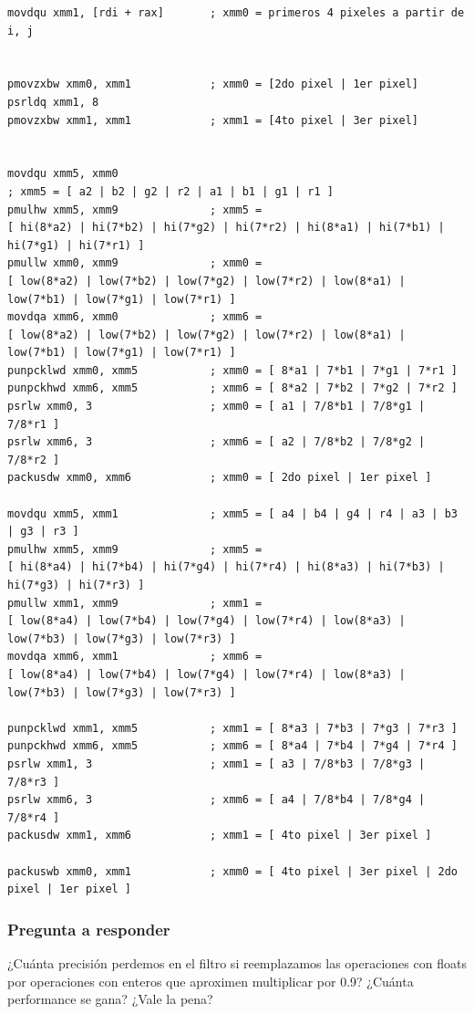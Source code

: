 \begin{codesnippet}
    \begin{verbatim}
movdqu xmm1, [rdi + rax]       ; xmm0 = primeros 4 pixeles a partir de i, j


pmovzxbw xmm0, xmm1            ; xmm0 = [2do pixel | 1er pixel]
psrldq xmm1, 8
pmovzxbw xmm1, xmm1            ; xmm1 = [4to pixel | 3er pixel]


movdqu xmm5, xmm0              
; xmm5 = [ a2 | b2 | g2 | r2 | a1 | b1 | g1 | r1 ]
pmulhw xmm5, xmm9              ; xmm5 = 
[ hi(8*a2) | hi(7*b2) | hi(7*g2) | hi(7*r2) | hi(8*a1) | hi(7*b1) | hi(7*g1) | hi(7*r1) ]
pmullw xmm0, xmm9              ; xmm0 = 
[ low(8*a2) | low(7*b2) | low(7*g2) | low(7*r2) | low(8*a1) | low(7*b1) | low(7*g1) | low(7*r1) ]
movdqa xmm6, xmm0              ; xmm6 = 
[ low(8*a2) | low(7*b2) | low(7*g2) | low(7*r2) | low(8*a1) | low(7*b1) | low(7*g1) | low(7*r1) ]
punpcklwd xmm0, xmm5           ; xmm0 = [ 8*a1 | 7*b1 | 7*g1 | 7*r1 ]
punpckhwd xmm6, xmm5           ; xmm6 = [ 8*a2 | 7*b2 | 7*g2 | 7*r2 ]
psrlw xmm0, 3                  ; xmm0 = [ a1 | 7/8*b1 | 7/8*g1 | 7/8*r1 ]
psrlw xmm6, 3                  ; xmm6 = [ a2 | 7/8*b2 | 7/8*g2 | 7/8*r2 ]
packusdw xmm0, xmm6            ; xmm0 = [ 2do pixel | 1er pixel ]

movdqu xmm5, xmm1              ; xmm5 = [ a4 | b4 | g4 | r4 | a3 | b3 | g3 | r3 ]
pmulhw xmm5, xmm9              ; xmm5 = 
[ hi(8*a4) | hi(7*b4) | hi(7*g4) | hi(7*r4) | hi(8*a3) | hi(7*b3) | hi(7*g3) | hi(7*r3) ]
pmullw xmm1, xmm9              ; xmm1 = 
[ low(8*a4) | low(7*b4) | low(7*g4) | low(7*r4) | low(8*a3) | low(7*b3) | low(7*g3) | low(7*r3) ]
movdqa xmm6, xmm1              ; xmm6 = 
[ low(8*a4) | low(7*b4) | low(7*g4) | low(7*r4) | low(8*a3) | low(7*b3) | low(7*g3) | low(7*r3) ]

punpcklwd xmm1, xmm5           ; xmm1 = [ 8*a3 | 7*b3 | 7*g3 | 7*r3 ]
punpckhwd xmm6, xmm5           ; xmm6 = [ 8*a4 | 7*b4 | 7*g4 | 7*r4 ]
psrlw xmm1, 3                  ; xmm1 = [ a3 | 7/8*b3 | 7/8*g3 | 7/8*r3 ]
psrlw xmm6, 3                  ; xmm6 = [ a4 | 7/8*b4 | 7/8*g4 | 7/8*r4 ]
packusdw xmm1, xmm6            ; xmm1 = [ 4to pixel | 3er pixel ]

packuswb xmm0, xmm1            ; xmm0 = [ 4to pixel | 3er pixel | 2do pixel | 1er pixel ]
	\end{verbatim}
\end{codesnippet}




\subsubsection{Pregunta a responder}
\par ¿Cuánta precisión perdemos en el filtro si reemplazamos las operaciones con floats por operaciones con enteros que aproximen multiplicar por 0.9?
¿Cuánta performance se gana? ¿Vale la pena?


